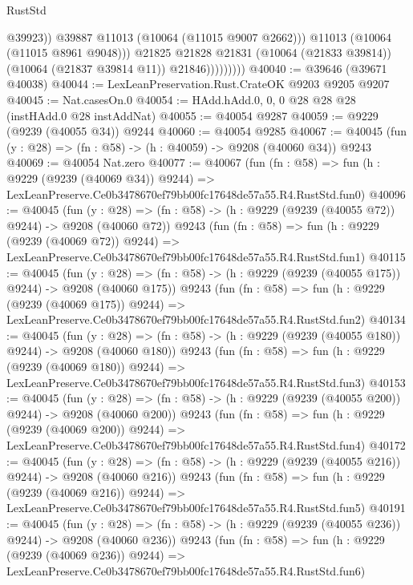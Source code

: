\begin{lexlean}{RustStd}
\begin{coremodule}
                              @39923))
                          @39887
                          @11013
                          (@10064 (@11015 @9007 @2662)))
                        @11013
                        (@10064 (@11015 @8961 @9048)))
                      @21825
                      @21828
                      @21831
                      (@10064 (@21833 @39814))
                      (@10064 (@21837 @39814 @11))
                      @21846)))))))))
@40040 := @39646 (@39671 @40038)
@40044 := LexLeanPreservation.Rust.CrateOK @9203 @9205 @9207
@40045 := Nat.casesOn.{0}
@40054 := HAdd.hAdd.{0, 0, 0} @28 @28 @28 (instHAdd.{0} @28 instAddNat)
@40055 := @40054 @9287
@40059 := @9229 (@9239 (@40055 @34)) @9244
@40060 := @40054 @9285
@40067 := @40045 (fun (y : @28) => (fn : @58) -> (h : @40059) -> @9208 (@40060 @34)) @9243
@40069 := @40054 Nat.zero
@40077 := @40067
    (fun (fn : @58) =>
    fun (h : @9229 (@9239 (@40069 @34)) @9244) =>
    LexLeanPreserve.Ce0b3478670ef79bb00fc17648de57a55.R4.RustStd.fun0)
@40096 := @40045
    (fun (y : @28) => (fn : @58) -> (h : @9229 (@9239 (@40055 @72)) @9244) -> @9208 (@40060 @72))
    @9243
    (fun (fn : @58) =>
    fun (h : @9229 (@9239 (@40069 @72)) @9244) =>
    LexLeanPreserve.Ce0b3478670ef79bb00fc17648de57a55.R4.RustStd.fun1)
@40115 := @40045
    (fun (y : @28) => (fn : @58) -> (h : @9229 (@9239 (@40055 @175)) @9244) -> @9208 (@40060 @175))
    @9243
    (fun (fn : @58) =>
    fun (h : @9229 (@9239 (@40069 @175)) @9244) =>
    LexLeanPreserve.Ce0b3478670ef79bb00fc17648de57a55.R4.RustStd.fun2)
@40134 := @40045
    (fun (y : @28) => (fn : @58) -> (h : @9229 (@9239 (@40055 @180)) @9244) -> @9208 (@40060 @180))
    @9243
    (fun (fn : @58) =>
    fun (h : @9229 (@9239 (@40069 @180)) @9244) =>
    LexLeanPreserve.Ce0b3478670ef79bb00fc17648de57a55.R4.RustStd.fun3)
@40153 := @40045
    (fun (y : @28) => (fn : @58) -> (h : @9229 (@9239 (@40055 @200)) @9244) -> @9208 (@40060 @200))
    @9243
    (fun (fn : @58) =>
    fun (h : @9229 (@9239 (@40069 @200)) @9244) =>
    LexLeanPreserve.Ce0b3478670ef79bb00fc17648de57a55.R4.RustStd.fun4)
@40172 := @40045
    (fun (y : @28) => (fn : @58) -> (h : @9229 (@9239 (@40055 @216)) @9244) -> @9208 (@40060 @216))
    @9243
    (fun (fn : @58) =>
    fun (h : @9229 (@9239 (@40069 @216)) @9244) =>
    LexLeanPreserve.Ce0b3478670ef79bb00fc17648de57a55.R4.RustStd.fun5)
@40191 := @40045
    (fun (y : @28) => (fn : @58) -> (h : @9229 (@9239 (@40055 @236)) @9244) -> @9208 (@40060 @236))
    @9243
    (fun (fn : @58) =>
    fun (h : @9229 (@9239 (@40069 @236)) @9244) =>
    LexLeanPreserve.Ce0b3478670ef79bb00fc17648de57a55.R4.RustStd.fun6)

\end{coremodule}
\end{lexlean}
